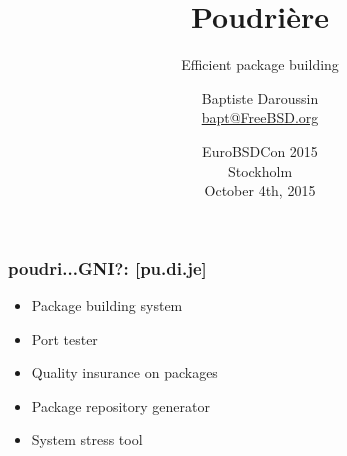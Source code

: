 
\usepackage{color}
\usepackage{listings}
\usepackage{tipa}
\usepackage{svg}
\newcommand{\prestitle}{EuroBSDCon 2015}
\lstset{
	numbers=none,
	frame=l,
	aboveskip=0pt, belowskip=0pt
}

\title{Poudrière}
\subtitle{Efficient package building}
\author{Baptiste Daroussin \\ \url{bapt@FreeBSD.org}}
\date{EuroBSDCon 2015 \\ Stockholm \\ October 4th, 2015}


\begin{frame}[plain]
	\titlepage
\end{frame}

\begin{frame}
	\frametitle{poudri...GNI?: [pu.d\textipa{\textinvscr}i.je\textipa{\textinvscr}]}
	\begin{itemize}
		\item Package building system
		\item Port tester
		\item Quality insurance on packages
		\item Package repository generator
		\item System stress tool
	\end{itemize}
\end{frame}

